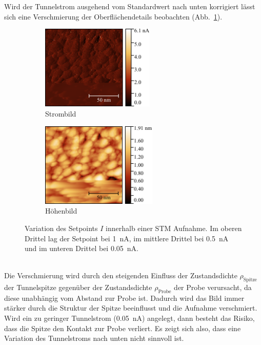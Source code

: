\documentclass[a4paper,twoside,final]{article}
\begin{document}
Wird der Tunnelstrom ausgehend vom Standardwert nach unten korrigiert lässt sich eine Verschmierung der Oberflächendetails beobachten (Abb.~\ref{fig:Stromvariation_2}).
\begin{figure}[htp]
    \centering
    \begin{subfigure}{0.45\textwidth}
        \includegraphics[height=4cm]{Bilder/Image01959_Stromvariation_Strom.pdf}
        \caption{Strombild}
    \end{subfigure}
    \hspace{0.5cm}
    \begin{subfigure}{0.45\textwidth}
        \includegraphics[height=4cm]{Bilder/Image01959_Stromvariation.pdf}
        \caption{Höhenbild}
    \end{subfigure}
    \caption{Variation des Setpoints $I$ innerhalb einer STM Aufnahme. Im oberen Drittel lag der Setpoint bei \SI{1}{\nano\ampere}, im mittlere Drittel bei \SI{0.5}{\nano\ampere} und im unteren Drittel bei \SI{0.05}{\nano\ampere}.}
    \label{fig:Stromvariation_2}
\end{figure}\\
Die Verschmierung wird durch den steigenden Einfluss der Zustandsdichte $\rho_\text{Spitze}$ der Tunnelspitze gegenüber der Zustandsdichte $\rho_\text{Probe}$ der Probe verursacht, da diese unabhängig vom Abstand zur Probe ist. Dadurch wird das Bild immer stärker durch die Struktur der Spitze beeinflusst und die Aufnahme verschmiert. Wird ein zu geringer Tunnelstrom (\SI{0.05}{\nano\ampere}) angelegt, dann besteht das Risiko, dass die Spitze den Kontakt zur Probe verliert. Es zeigt sich also, dass eine Variation des Tunnelstroms nach unten nicht sinnvoll ist.
\end{document}
